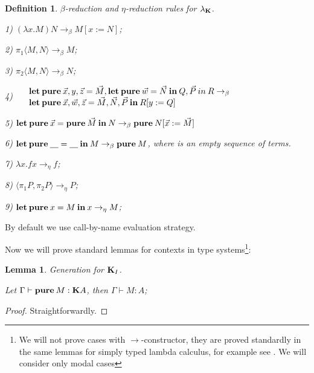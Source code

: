 \documentclass[a4paper]{article}
\newtheorem{lemma}{Lemma}
\newtheorem{defin}{Definition}
\begin{document}
  \begin{defin} $\beta$-reduction and $\eta$-reduction rules for $\lambda_{{\bf K}}$.

  1) $(\lambda x. M) N \rightarrow_{\beta} M [x := N]$;

  2) $\pi_1 \langle M, N \rangle \rightarrow_{\beta} M$;

  3) $\pi_2 \langle M, N \rangle \rightarrow_{\beta} N$;

  4) $\begin{array}{llll}
  & {\bf let \: pure \:} \vec{x}, y, \vec{z} = \vec{M}, {\bf let \: pure \: } \vec{w} = \vec{N} {\: \bf in \: } Q, \vec{P} {\: in \:} R \rightarrow_{\beta} & \\
  & {\bf let \: pure \:} \vec{x}, \vec{w}, \vec{z} = \vec{M}, \vec{N}, \vec{P} {\: \bf in \: } R [y := Q]
  \end{array}$

  5) ${\bf let \: pure \:} \vec{x} = {\bf pure \:} \vec{M} {\: \bf in \:} N \rightarrow_{\beta} {\bf pure \:} N [\vec{x} := \vec{M}]$

  6) ${\bf let \: pure \:} \underline{\quad} = \underline{\quad} {\: \bf in \:} M \rightarrow_{\beta} {\bf pure \:} M$, where \underline{\quad} is an empty sequence of terms.

  7) $\lambda x. f x \rightarrow_{\eta} f$;

  8) $\langle \pi_1 P, \pi_2 P \rangle \rightarrow_{\eta} P$;

  9) ${\bf let \: pure \:} x = M {\: \bf in \: } x \rightarrow_{\eta} M$;

  \end{defin}

By default we use call-by-name evaluation strategy.


Now we will prove standard lemmas for contexts in type systems\footnote{We will not prove cases with
$\to$-constructor, they are proved standardly in the same lemmas for simply typed lambda calculus, for
example see \cite{Neder} \cite{Morten}. We will consider only modal cases}:

\begin{lemma} Generation for ${\bf K}_I$.

  Let $\Gamma \vdash {\bf pure \:} M : {\bf K}A$, then $\Gamma \vdash M : A$;
\end{lemma}

\begin{proof}
  Straightforwardly.
\end{proof}
\end{document}
